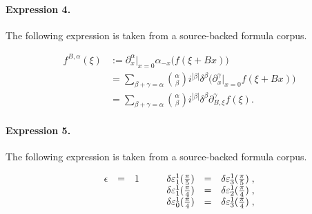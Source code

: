 \documentclass[11pt]{article}
\begin{document}
\paragraph{Expression 4.} The following expression is taken from a source-backed formula corpus.

\begin{align*} f^{B,\alpha}(\xi) &:= \partial_x^\alpha\big|_{x=0} \alpha_{-x} \big( f(\xi+Bx) \big) \\&= \sum_{\beta+\gamma = \alpha} \binom \alpha \beta i^{|\beta|}\delta^\beta \big (\partial_x^\gamma\big|_{x=0} f(\xi+Bx) \big) \\&= \sum_{\beta+\gamma = \alpha} \binom \alpha \beta i^{|\beta|}\delta^\beta \partial_{B,\xi}^\gamma f(\xi) . \end{align*}

\paragraph{Expression 5.} The following expression is taken from a source-backed formula corpus.

\begin{align*}\begin{array}{lcrcl}\epsilon&=&1\hspace{10mm}\delta\varepsilon^{1}_{1}(\frac{\pi}{5})&=&\delta\varepsilon^{1}_{3}(\frac{\pi}{5})\;,\\ &&\delta\varepsilon^{1}_{1}(\frac{\pi}{4})&=&\delta\varepsilon^{1}_{2}(\frac{\pi}{4})\;,\\ &&\delta\varepsilon^{1}_{0}(\frac{\pi}{4})&=&\delta\varepsilon^{1}_{3}(\frac{\pi}{4})\;, \end{array}\end{align*}
\end{document}
